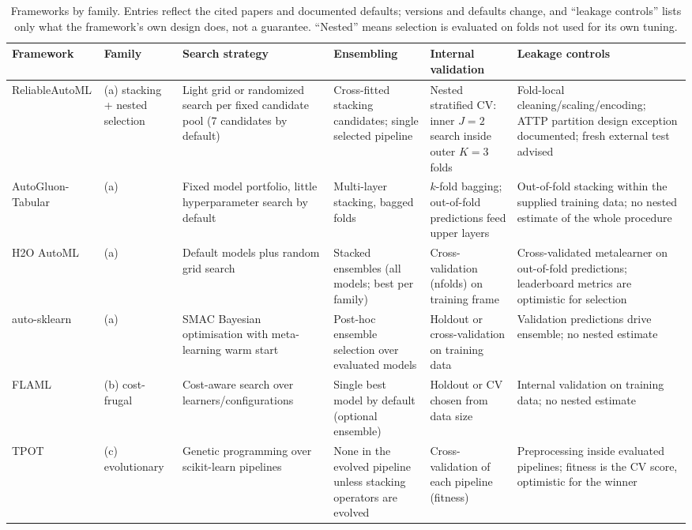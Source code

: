 \documentclass[conference]{IEEEtran}
\begin{document}
\begin{table}[t]
\caption{Frameworks by family. Entries reflect the cited papers and documented defaults; versions and defaults change, and ``leakage controls'' lists only what the framework's own design does, not a guarantee. ``Nested'' means selection is evaluated on folds not used for its own tuning.}
\label{tab:family}
\centering\scriptsize
\begin{tabular}{p{}p{}p{}p{}p{}p{}}
\toprule
Framework & Family & Search strategy & Ensembling & Internal validation & Leakage controls\\
\midrule
ReliableAutoML & (a) stacking + nested selection & Light grid or randomized search per fixed candidate pool (7 candidates by default) & Cross-fitted stacking candidates; single selected pipeline & Nested stratified CV: inner $J=2$ search inside outer $K=3$ folds & Fold-local cleaning/scaling/encoding; ATTP partition design exception documented; fresh external test advised\\
AutoGluon-Tabular & (a) & Fixed model portfolio, little hyperparameter search by default~\cite{erickson2020} & Multi-layer stacking, bagged folds & $k$-fold bagging; out-of-fold predictions feed upper layers & Out-of-fold stacking within the supplied training data; no nested estimate of the whole procedure\\
H2O AutoML & (a) & Default models plus random grid search~\cite{ledell2020} & Stacked ensembles (all models; best per family) & Cross-validation (nfolds) on training frame & Cross-validated metalearner on out-of-fold predictions; leaderboard metrics are optimistic for selection\\
auto-sklearn & (a) & SMAC Bayesian optimisation with meta-learning warm start~\cite{feurer2015} & Post-hoc ensemble selection over evaluated models & Holdout or cross-validation on training data & Validation predictions drive ensemble; no nested estimate\\
FLAML & (b) cost-frugal & Cost-aware search over learners/configurations~\cite{wang2021} & Single best model by default (optional ensemble) & Holdout or CV chosen from data size & Internal validation on training data; no nested estimate\\
TPOT & (c) evolutionary & Genetic programming over scikit-learn pipelines~\cite{olson2016} & None in the evolved pipeline unless stacking operators are evolved & Cross-validation of each pipeline (fitness) & Preprocessing inside evaluated pipelines; fitness is the CV score, optimistic for the winner\\
\bottomrule
\end{tabular}
\end{table}
\end{document}
